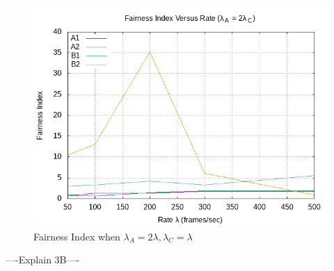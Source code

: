 \documentclass[12pt]{article}
\begin{document}
\begin{enumerate}
{            \begin{figure}[!htb]
                \centering
                \includegraphics[width=5in]{3B.png}
                \caption{Fairness Index when \(\lambda{}_A = 2\lambda{}, \lambda{}_C = \lambda{}\) }
                \label{fig:3B}
            \end{figure}

            ----Explain 3B----
        }    
    \end{enumerate}
\end{document}

